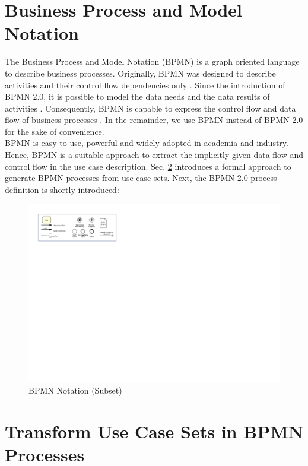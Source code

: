 \section{Business Process and Model Notation}
\label{sec:Fundamentals:BPMN}
The Business Process and Model Notation (BPMN) is a graph oriented language to describe business processes. Originally, BPMN was designed to describe activities and their control flow dependencies only \cite{VisualizeBPMN}. Since the introduction of BPMN 2.0, it is possible to model the data needs and the data results of activities \cite{OMG}. Consequently, BPMN is capable to express the control flow and data flow of business processes \cite{DataFlowErrorBPMN}. In the remainder, we use BPMN instead of BPMN 2.0 for the sake of convenience. \\
BPMN is easy-to-use, powerful and widely adopted in academia and industry. Hence, BPMN is a suitable approach to extract the implicitly given data flow and control flow in the use case description. Sec. \ref{sec:Fundamentals:TransformUCtoBPMN} introduces a formal approach to generate BPMN processes from use case sets. Next, the BPMN 2.0 process definition is shortly introduced:


\begin{figure}[h!]
	\includegraphics[width=\textwidth, trim={1cm 16.5cm 19.2cm 1cm}]{img/Overview.pdf}
	\caption{BPMN Notation (Subset)}
	\label{fig:BPMNSubset}
\end{figure}





\section{Transform Use Case Sets in BPMN Processes}
\label{sec:Fundamentals:TransformUCtoBPMN}

